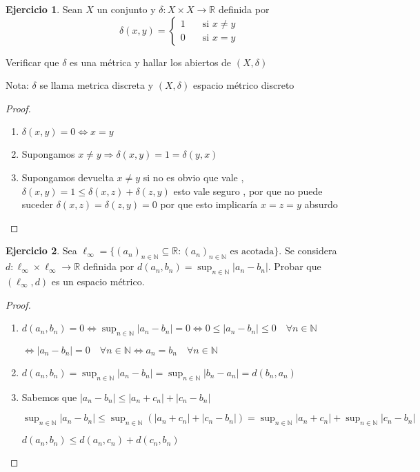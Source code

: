 \documentclass[12pt]{article}
\newcommand{\R}{\mathbb{R}}
\newcommand{\N}{\mathbb{N}}
\newcommand{\Ra}{\Rightarrow}
\newcommand{\ra}{\rightarrow}
\theoremstyle{definition}
\newtheorem{ej}{Ejercicio}
\begin{document}
\begin{ej}
  Sean $X$ un conjunto y $\delta : X \times X \ra \R$ definida por
$$
\delta(x,y) = \left\{
        \begin{array}{ll}
	 1 & \quad \text{si } x \neq y  \\
	  0 & \quad \text{si } x = y
        \end{array}
    \right.
$$

\noindent Verificar que $\delta$ es una métrica y hallar los abiertos de $(X, \delta)$

\noindent Nota: $\delta$ se llama metrica discreta y $(X,\delta)$ espacio métrico discreto

\begin{proof}
  \begin{enumerate}
    \item $\delta (x,y) = 0 \iff x = y$
    \item Supongamos $x\neq y \Ra \delta (x,y) = 1 = \delta(y,x)$
    \item Supongamos devuelta $x \neq y$ si no es obvio que vale , $\delta (x,y) = 1 \leq \delta (x,z) + \delta (z,y)$ esto vale seguro , por que no puede suceder $\delta (x,z) = \delta (z,y) = 0$ por que esto implicaría $x = z = y$ absurdo 
  \end{enumerate}
\end{proof}
\end{ej}

\begin{ej}
  Sea $\ell_{\infty} = \{(a_{n})_{n \in \N} \subseteq \R : (a_{n})_{n \in \N} \text{ es acotada} \}$. Se considera $d: \ell_{\infty} \times \ell_{\infty} \ra \R$ definida por $d(a_{n},b_{n}) = \sup_{n \in \N}{|a_{n} - b_{n}|}$. Probar que $(\ell_{\infty},d)$ es un espacio métrico. 

  \begin{proof}
    \begin{enumerate}
      \item $d(a_{n},b_{n}) = 0 \iff \sup_{n \in \N}{|a_{n} - b_{n}| = 0} \iff 0 \leq |a_{n} - b_{n}| \leq 0 \quad \forall n \in \N $

$	\iff |a_{n} - b_{n}| = 0 \quad \forall n \in \N \iff a_{n} = b_{n} \quad \forall n \in \N$ 
      \item $d(a_{n},b_{n}) = \sup_{n \in \N}|a_{n} - b_{n}| = \sup_{n \in \N}|b_{n} - a_{n}| = d(b_{n},a_{n})$
      \item  Sabemos que $|a_{n} - b_{n}| \leq |a_{n} + c_{n}| + |c_{n} - b_{n}| $

	$   \sup_{n \in \N}|a_{n} - b_{n}| \leq  \sup_{n \in \N}(|a_{n} + c_{n}| + |c_{n} - b_{n}|) =   \sup_{n \in \N}|a_{n} + c_{n}| +  \sup_{n \in \N}|c_{n} - b_{n}| $

      $  d(a_{n},b_{n}) \leq d(a_{n},c_{n}) + d(c_{n},b_{n})  $
    \end{enumerate}
  \end{proof}
\end{ej}
\end{document}
